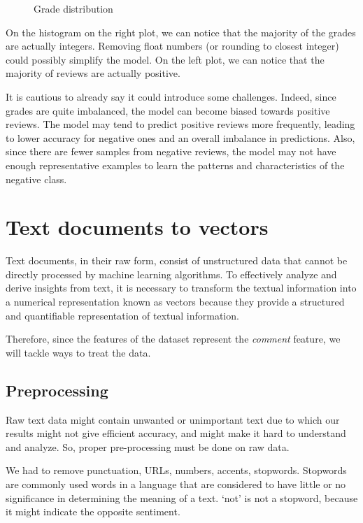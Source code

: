 \documentclass{article}
\begin{document}
\begin{figure}[H]
\begin{minipage}[t]{0.49\linewidth}
  \end{minipage}
  \caption{Grade distribution}
\end{figure}

On the histogram on the right plot, 
we can notice that the majority of the grades are actually integers. Removing float numbers (or rounding to closest integer) could possibly simplify the model.
On the left plot, we can notice that the majority of reviews are actually positive.

It is cautious to already say it could introduce some challenges. Indeed, since grades are quite imbalanced, the model can become biased towards positive reviews. The model may tend to predict positive reviews more frequently, leading to lower accuracy for negative ones and an overall imbalance in predictions. Also, since there are fewer samples from negative reviews, the model may not have enough representative examples to learn the patterns and characteristics of the negative class.

\section{Text documents to vectors}

Text documents, in their raw form, consist of unstructured data that cannot be directly processed by machine learning algorithms. To effectively analyze and derive insights from text, it is necessary to transform the textual information into a numerical representation known as vectors because they provide a structured and quantifiable representation of textual information.

Therefore, since the features of the dataset represent the \textit{comment} feature, we will tackle ways to treat the data.
\subsection{Preprocessing}

Raw text data might contain unwanted or unimportant text due to which our results might not give efficient accuracy, and might make it hard to understand and analyze. So, proper pre-processing must be done on raw data.

We had to remove punctuation, URLs, numbers, accents, stopwords.
Stopwords are commonly used words in a language that are considered to have little or no significance in determining the meaning of a text.
`not' is not a stopword, because it might indicate the opposite sentiment.
\end{document}
